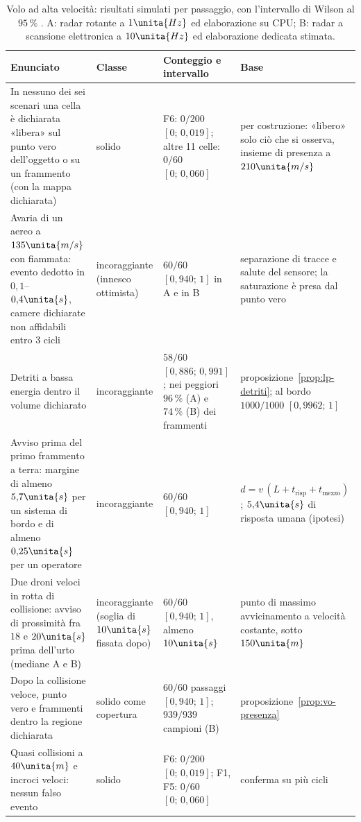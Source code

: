 \begin{table}[H]\centering\footnotesize
\caption{Volo ad alta velocità: risultati simulati per passaggio, con l'intervallo di Wilson al $95\,\%$ . A: radar rotante a $1\unita{Hz}$ ed elaborazione su CPU; B: radar a scansione elettronica a $10\unita{Hz}$ ed elaborazione dedicata stimata.}\label{tab:vo-risultati}
\begin{tabularx}{\linewidth}{@{}>{\RaggedRight\arraybackslash}p{5.3cm}>{\RaggedRight\arraybackslash}p{2.0cm}>{\RaggedRight\arraybackslash}p{4.2cm}L@{}}
\toprule
Enunciato & Classe & Conteggio e intervallo & Base\\
\midrule
In nessuno dei sei scenari una cella è dichiarata «libera» sul punto vero dell'oggetto o su un frammento (con la mappa dichiarata) & solido & F6: $0/200$ $[0;\,0{,}019]$; altre 11 celle: $0/60$ $[0;\,0{,}060]$ & per costruzione: «libero» solo ciò che si osserva, insieme di presenza a $210\unita{m/s}$\\
Avaria di un aereo a $135\unita{m/s}$ con fiammata: evento dedotto in $0{,}1$--$0{,}4\unita{s}$, camere dichiarate non affidabili entro 3 cicli & incoraggiante (innesco ottimista) & $60/60$ $[0{,}940;\,1]$ in A e in B & separazione di tracce e salute del sensore; la saturazione è presa dal punto vero\\
Detriti a bassa energia dentro il volume dichiarato & incoraggiante & $58/60$ $[0{,}886;\,0{,}991]$; nei peggiori $96\,\%$ (A) e $74\,\%$ (B) dei frammenti & proposizione~\ref{prop:lp-detriti}; al bordo $1000/1000$ $[0{,}9962;\,1]$\\
Avviso prima del primo frammento a terra: margine di almeno $5{,}7\unita{s}$ per un sistema di bordo e di almeno $0{,}25\unita{s}$ per un operatore & incoraggiante & $60/60$ $[0{,}940;\,1]$ & $d=v\,(L+t_{\mathrm{risp}}+t_{\mathrm{mezzo}})$; $5{,}4\unita{s}$ di risposta umana (ipotesi)\\
Due droni veloci in rotta di collisione: avviso di prossimità fra $18$ e $20\unita{s}$ prima dell'urto (mediane A e B) & incoraggiante (soglia di $10\unita{s}$ fissata dopo) & $60/60$ $[0{,}940;\,1]$, almeno $10\unita{s}$ & punto di massimo avvicinamento a velocità costante, sotto $150\unita{m}$\\
Dopo la collisione veloce, punto vero e frammenti dentro la regione dichiarata & solido come copertura & $60/60$ passaggi $[0{,}940;\,1]$; $939/939$ campioni (B) & proposizione~\ref{prop:vo-presenza}\\
Quasi collisioni a $40\unita{m}$ e incroci veloci: nessun falso evento & solido & F6: $0/200$ $[0;\,0{,}019]$; F1, F5: $0/60$ $[0;\,0{,}060]$ & conferma su più cicli\\

\end{tabularx}
\end{table}
